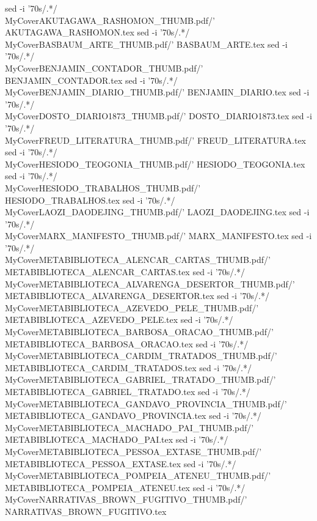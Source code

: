 sed -i '70s/.*/\\MyCover{AKUTAGAWA_RASHOMON_THUMB.pdf}/' AKUTAGAWA_RASHOMON.tex
sed -i '70s/.*/\\MyCover{BASBAUM_ARTE_THUMB.pdf}/' BASBAUM_ARTE.tex
sed -i '70s/.*/\\MyCover{BENJAMIN_CONTADOR_THUMB.pdf}/' BENJAMIN_CONTADOR.tex
sed -i '70s/.*/\\MyCover{BENJAMIN_DIARIO_THUMB.pdf}/' BENJAMIN_DIARIO.tex
sed -i '70s/.*/\\MyCover{DOSTO_DIARIO1873_THUMB.pdf}/' DOSTO_DIARIO1873.tex
sed -i '70s/.*/\\MyCover{FREUD_LITERATURA_THUMB.pdf}/' FREUD_LITERATURA.tex
sed -i '70s/.*/\\MyCover{HESIODO_TEOGONIA_THUMB.pdf}/' HESIODO_TEOGONIA.tex
sed -i '70s/.*/\\MyCover{HESIODO_TRABALHOS_THUMB.pdf}/' HESIODO_TRABALHOS.tex
sed -i '70s/.*/\\MyCover{LAOZI_DAODEJING_THUMB.pdf}/' LAOZI_DAODEJING.tex
sed -i '70s/.*/\\MyCover{MARX_MANIFESTO_THUMB.pdf}/' MARX_MANIFESTO.tex
sed -i '70s/.*/\\MyCover{METABIBLIOTECA_ALENCAR_CARTAS_THUMB.pdf}/' METABIBLIOTECA_ALENCAR_CARTAS.tex
sed -i '70s/.*/\\MyCover{METABIBLIOTECA_ALVARENGA_DESERTOR_THUMB.pdf}/' METABIBLIOTECA_ALVARENGA_DESERTOR.tex
sed -i '70s/.*/\\MyCover{METABIBLIOTECA_AZEVEDO_PELE_THUMB.pdf}/' METABIBLIOTECA_AZEVEDO_PELE.tex
sed -i '70s/.*/\\MyCover{METABIBLIOTECA_BARBOSA_ORACAO_THUMB.pdf}/' METABIBLIOTECA_BARBOSA_ORACAO.tex
sed -i '70s/.*/\\MyCover{METABIBLIOTECA_CARDIM_TRATADOS_THUMB.pdf}/' METABIBLIOTECA_CARDIM_TRATADOS.tex
sed -i '70s/.*/\\MyCover{METABIBLIOTECA_GABRIEL_TRATADO_THUMB.pdf}/' METABIBLIOTECA_GABRIEL_TRATADO.tex
sed -i '70s/.*/\\MyCover{METABIBLIOTECA_GANDAVO_PROVINCIA_THUMB.pdf}/' METABIBLIOTECA_GANDAVO_PROVINCIA.tex
sed -i '70s/.*/\\MyCover{METABIBLIOTECA_MACHADO_PAI_THUMB.pdf}/' METABIBLIOTECA_MACHADO_PAI.tex
sed -i '70s/.*/\\MyCover{METABIBLIOTECA_PESSOA_EXTASE_THUMB.pdf}/' METABIBLIOTECA_PESSOA_EXTASE.tex
sed -i '70s/.*/\\MyCover{METABIBLIOTECA_POMPEIA_ATENEU_THUMB.pdf}/' METABIBLIOTECA_POMPEIA_ATENEU.tex
sed -i '70s/.*/\\MyCover{NARRATIVAS_BROWN_FUGITIVO_THUMB.pdf}/' NARRATIVAS_BROWN_FUGITIVO.tex
